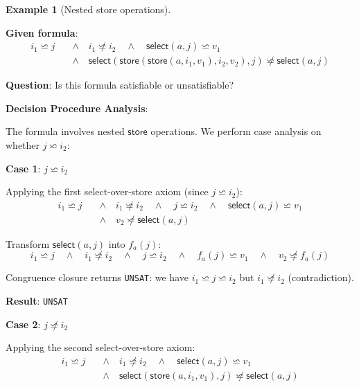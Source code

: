 \documentclass[11pt,a4paper]{article}
\theoremstyle{definition}
\newtheorem{example}{Example}[section]
\theoremstyle{plain}
\theoremstyle{remark}
\begin{document}
\begin{example}[Nested store operations]
\begin{tcolorbox}[colback=red!5!white,colframe=red!75!black,title=\textbf{Example 4: UNSAT with Nested Stores},breakable]
\textbf{Given formula}:
\begin{align*}
i_1 \backsimeq j \quad &\wedge \quad i_1 \not\backsimeq i_2 \quad \wedge \quad \textsf{select}(a, j) \backsimeq v_1 \\
&\wedge \quad \textsf{select}(\textsf{store}(\textsf{store}(a, i_1, v_1), i_2, v_2), j) \not\backsimeq \textsf{select}(a, j)
\end{align*}

\textbf{Question}: Is this formula satisfiable or unsatisfiable?

\vspace{0.5em}

\textbf{Decision Procedure Analysis}:

The formula involves nested $\textsf{store}$ operations. We perform case analysis on whether $j \backsimeq i_2$:

\vspace{0.3em}

\textbf{Case 1}: $j \backsimeq i_2$

Applying the first select-over-store axiom (since $j \backsimeq i_2$):
\begin{align*}
i_1 \backsimeq j \quad &\wedge \quad i_1 \not\backsimeq i_2 \quad \wedge \quad j \backsimeq i_2 \quad \wedge \quad \textsf{select}(a, j) \backsimeq v_1 \\
&\wedge \quad v_2 \not\backsimeq \textsf{select}(a, j)
\end{align*}

Transform $\textsf{select}(a, j)$ into $f_a(j)$:
\[
i_1 \backsimeq j \quad \wedge \quad i_1 \not\backsimeq i_2 \quad \wedge \quad j \backsimeq i_2 \quad \wedge \quad f_a(j) \backsimeq v_1 \quad \wedge \quad v_2 \not\backsimeq f_a(j)
\]

Congruence closure returns \texttt{UNSAT}: we have $i_1 \backsimeq j \backsimeq i_2$ but $i_1 \not\backsimeq i_2$ (contradiction).

\textbf{Result}: \texttt{UNSAT}

\vspace{0.3em}

\textbf{Case 2}: $j \not\backsimeq i_2$

Applying the second select-over-store axiom:
\begin{align*}
i_1 \backsimeq j \quad &\wedge \quad i_1 \not\backsimeq i_2 \quad \wedge \quad \textsf{select}(a, j) \backsimeq v_1 \\
&\wedge \quad \textsf{select}(\textsf{store}(a, i_1, v_1), j) \not\backsimeq \textsf{select}(a, j)
\end{align*}


\end{tcolorbox}
\end{example}
\end{document}
